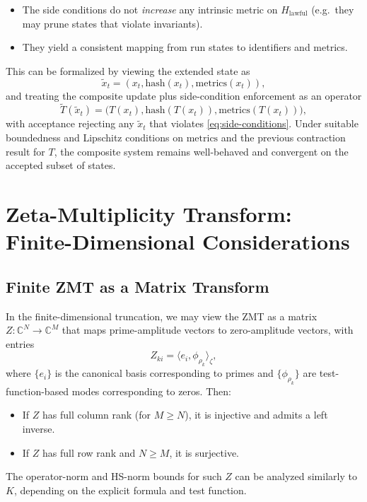 \documentclass[11pt]{article}
\begin{document}
\begin{itemize}
  \item The side conditions do not \emph{increase} any intrinsic metric on $H_{\mathrm{lawful}}$ (e.g.\ they may prune states that violate invariants).
  \item They yield a consistent mapping from run states to identifiers and metrics.
\end{itemize}

This can be formalized by viewing the extended state as
\[
\widetilde{x}_t
  = (x_t, \mathrm{hash}(x_t), \mathrm{metrics}(x_t)),
\]
and treating the composite update plus side-condition enforcement as an operator
\[
\widetilde{T}(\widetilde{x}_t)
  = \bigl(T(x_t), \mathrm{hash}(T(x_t)), \mathrm{metrics}(T(x_t))\bigr),
\]
with acceptance rejecting any $\widetilde{x}_t$ that violates \eqref{eq:side-conditions}. Under suitable boundedness and Lipschitz conditions on $\mathrm{metrics}$ and the previous contraction result for $T$, the composite system remains well-behaved and convergent on the accepted subset of states.

\section{Zeta-Multiplicity Transform: Finite-Dimensional Considerations}

\subsection{Finite ZMT as a Matrix Transform}

In the finite-dimensional truncation, we may view the ZMT as a matrix $Z:\mathbb{C}^N\to\mathbb{C}^M$ that maps prime-amplitude vectors to zero-amplitude vectors, with entries
\begin{equation}
  Z_{k i}
    = \langle e_i, \phi_{\rho_k}\rangle_\zeta,
\end{equation}
where $\{e_i\}$ is the canonical basis corresponding to primes and $\{\phi_{\rho_k}\}$ are test-function-based modes corresponding to zeros. Then:

\begin{itemize}
  \item If $Z$ has full column rank (for $M\ge N$), it is injective and admits a left inverse.
  \item If $Z$ has full row rank and $N\ge M$, it is surjective.
\end{itemize}

The operator-norm and HS-norm bounds for such $Z$ can be analyzed similarly to $K$, depending on the explicit formula and test function.
\end{document}
